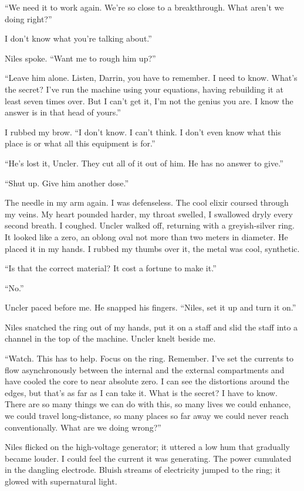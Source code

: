 \documentclass[
]{article}
\begin{document}
``We need it to work again. We're so close to a breakthrough. What
aren't we doing right?''

I don't know what you're talking about.''

Niles spoke. ``Want me to rough him up?''

``Leave him alone. Listen, Darrin, you have to remember. I need to know.
What's the secret? I've run the machine using your equations, having
rebuilding it at least seven times over. But I can't get it, I'm not the
genius you are. I know the answer is in that head of yours.''

I rubbed my brow. ``I don't know. I can't think. I don't even know what
this place is or what all this equipment is for.''

``He's lost it, Uncler. They cut all of it out of him. He has no answer
to give.''

``Shut up. Give him another dose.''

The needle in my arm again. I was defenseless. The cool elixir coursed
through my veins. My heart pounded harder, my throat swelled, I
swallowed dryly every second breath. I coughed. Uncler walked off,
returning with a greyish-silver ring. It looked like a zero, an oblong
oval not more than two meters in diameter. He placed it in my hands. I
rubbed my thumbs over it, the metal was cool, synthetic.

``Is that the correct material? It cost a fortune to make it.''

``No.''

Uncler paced before me. He snapped his fingers. ``Niles, set it up and
turn it on.''

Niles snatched the ring out of my hands, put it on a staff and slid the
staff into a channel in the top of the machine. Uncler knelt beside me.

``Watch. This has to help. Focus on the ring. Remember. I've set the
currents to flow asynchronously between the internal and the external
compartments and have cooled the core to near absolute zero. I can see
the distortions around the edges, but that's as far as I can take it.
What is the secret? I have to know. There are so many things we can do
with this, so many lives we could enhance, we could travel
long-distance, so many places so far away we could never reach
conventionally. What are we doing wrong?''

Niles flicked on the high-voltage generator; it uttered a low hum that
gradually became louder. I could feel the current it was generating. The
power cumulated in the dangling electrode. Bluish streams of electricity
jumped to the ring; it glowed with supernatural light.
\end{document}
